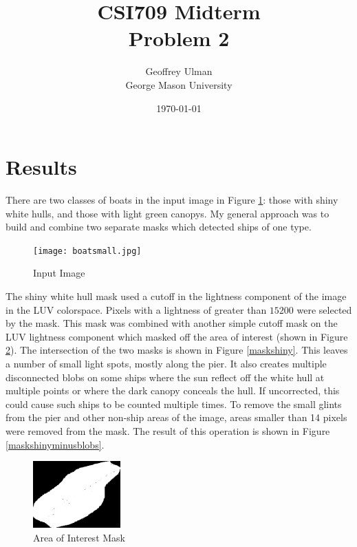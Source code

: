 \documentclass[12pt]{article}
\begin{document}
\title{CSI709 Midterm \\
Problem 2}
\author{
        Geoffrey Ulman \\
        George Mason University\\
}
\date{\today}

\maketitle

\section{Results}

There are two classes of boats in the input image in Figure \ref{boats}: those with shiny white hulls, and those with light green canopys. My general approach was to build and combine two separate masks which detected ships of one type.

\begin{figure}
\centering
\texttt{[image: boatsmall.jpg]}
\caption{Input Image}
\label{boats}
\end{figure}

The shiny white hull mask used a cutoff in the lightness component of the image in the LUV colorspace. Pixels with a lightness of greater than \(15200\) were selected by the mask. This mask was combined with another simple cutoff mask on the LUV lightness component which masked off the area of interest (shown in Figure \ref{bordermask}). The intersection of the two masks is shown in Figure \ref{maskshiny}. This leaves a number of small light spots, mostly along the pier. It also creates multiple disconnected blobs on some ships where the sun reflect off the white hull at multiple points or where the dark canopy conceals the hull. If uncorrected, this could cause such ships to be counted multiple times. To remove the small glints from the pier and other non-ship areas of the image, areas smaller than 14 pixels were removed from the mask. The result of this operation is shown in Figure \ref{maskshinyminusblobs}.

\begin{figure}
\centering
\includegraphics[width=0.30\textwidth]{border_mask.png}
\caption{Area of Interest Mask}
\label{bordermask}
\end{figure}
\end{document}
